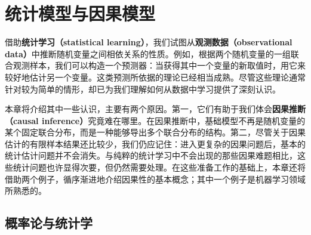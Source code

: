 \chapter{统计模型与因果模型}
\label{ch:statistical-causal-models}

借助\textbf{统计学习（statistical learning）}，我们试图从\textbf{观测数据（observational data）}中推断随机变量之间相依关系的性质。例如，根据两个随机变量的一组联合观测样本，我们可以构造一个预测器：当获得其中一个变量的新取值时，用它来较好地估计另一个变量。这类预测所依据的理论已经相当成熟。尽管这些理论通常针对较为简单的情形，却已为我们理解如何从数据中学习提供了深刻认识。

本章将介绍其中一些认识，主要有两个原因。第一，它们有助于我们体会\textbf{因果推断（causal inference）}究竟难在哪里。在因果推断中，基础模型不再是随机变量的某个固定联合分布，而是一种能够导出多个联合分布的结构。第二，尽管关于因果估计的有限样本结果还比较少，我们仍应记住：进入更复杂的因果问题后，基本的统计估计问题并不会消失。与纯粹的统计学习中不会出现的那些因果难题相比，这些统计问题也许显得次要，但仍然需要处理。在这些准备工作的基础上，本章还将借助两个例子，循序渐进地介绍因果性的基本概念；其中一个例子是机器学习领域所熟悉的。

\section{概率论与统计学}
\label{sec:probability-statistics}

